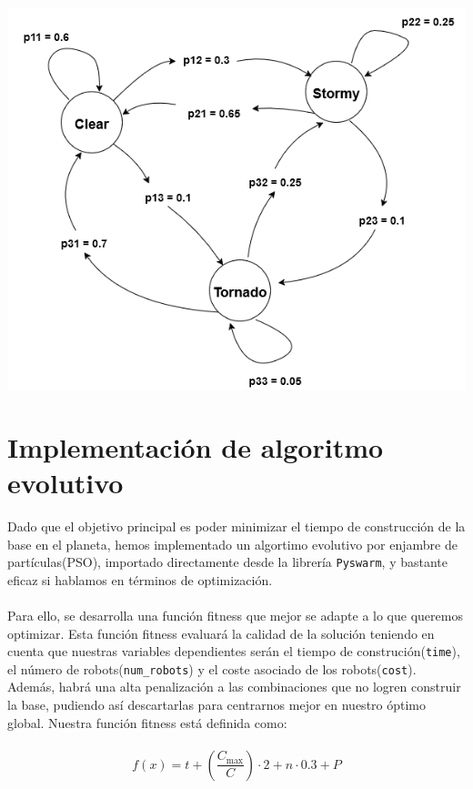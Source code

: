 \documentclass[a4paper,12pt]{article}
\begin{document}
\begin{center}
    \includegraphics[scale=0.48]{images/Markov_Chain.png}
\end{center}

\newpage
\section{Implementación de algoritmo evolutivo}
Dado que el objetivo principal es poder minimizar el tiempo de construcción de la base en el planeta, hemos implementado un algortimo evolutivo por enjambre de partículas(PSO), importado directamente desde la librería \texttt{Pyswarm}, y bastante eficaz si hablamos en términos de optimización.
\\\\
Para ello, se desarrolla una función fitness que mejor se adapte a lo que queremos optimizar. Esta función fitness evaluará la calidad de la solución teniendo en cuenta que nuestras variables dependientes serán el tiempo de construción(\texttt{time}), el número de robots(\texttt{num\_robots}) y el coste asociado de los robots(\texttt{cost}). Además, habrá una alta penalización a las combinaciones que no logren construir la base, pudiendo así descartarlas para centrarnos mejor en nuestro óptimo global. Nuestra función fitness está definida como:\\\\
\begin{equation}
f(x) = t + \left(\frac{C_\text{max}}{C}\right) \cdot 2 + n \cdot 0.3 + P
\end{equation}
\end{document}
